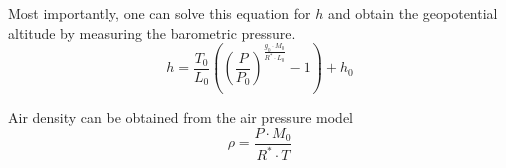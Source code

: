 Most importantly, one can solve this equation for $h$ and obtain the geopotential altitude by measuring the barometric pressure.
\begin{equation}
	h = \frac{T_0}{L_0}	\left( \left(\frac{P}{P_0}\right)^{\frac{g_0\cdot M_0}{R^* \cdot L_0}} -1\right) + h_0
\end{equation}

Air density can be obtained from the air pressure model
\begin{equation}
	\rho = \frac{P \cdot M_0}{R^* \cdot T}
\end{equation}